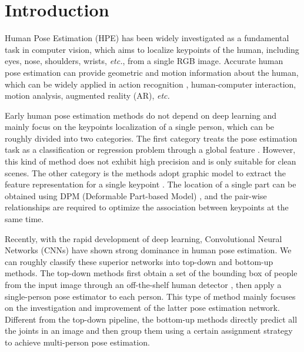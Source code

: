 \documentclass[runningheads]{llncs}
\begin{document}
\section{Introduction}
Human Pose Estimation (HPE) has been widely investigated as a fundamental task in computer vision, which aims to localize keypoints of the human, including eyes, nose, shoulders, wrists, \textit{etc.}, from a single RGB image. Accurate human pose estimation can provide geometric and motion information about the human, which can be widely applied in action recognition \cite{liu2018t,liu2020real}, human-computer interaction, motion analysis, augmented reality (AR), \textit{etc.}

Early human pose estimation methods do not depend on deep learning and mainly focus on the keypoints localization of a single person, which can be roughly divided into two categories. The first category treats the pose estimation task as a classification or regression problem through a global feature \cite{randomized2008,sparse2008}. However, this kind of method does not exhibit high precision and is only suitable for clean scenes. The other category is the methods adopt graphic model to extract the feature representation for a single keypoint \cite{strong2013,latent2011}. The location of a single part can be obtained using DPM (Deformable Part-based Model) \cite{DPM2010}, and the pair-wise relationships are required to optimize the association between keypoints at the same time.

Recently, with the rapid development of deep learning, Convolutional Neural Networks (CNNs) have shown strong dominance in human pose estimation. We can roughly classify these superior networks into top-down and bottom-up methods. The top-down methods \cite{CPM2016,Hourglass2016,CPN2018,simple_baseline2018,HRNet2019,MSPN2019,graph2020,learning2020} first obtain a set of the bounding box of people from the input image through an off-the-shelf human detector , then apply a single-person pose estimator to each person. This type of method mainly focuses on the investigation and improvement of the latter pose estimation network. Different from the top-down pipeline, the bottom-up methods \cite{deepcut2016,0penpose2017, RMPE2017, Higherhrnet2020,Simple2021} directly predict all the joints in an image and then group them using a certain assignment strategy to achieve multi-person pose estimation.
\end{document}
